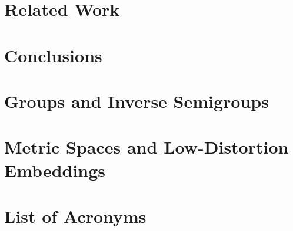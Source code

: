 \documentclass[
		twoside,openright,titlepage,numbers=noenddot,headinclude,%
	 	footinclude=true,cleardoublepage=empty,
		dottedtoc, %
		BCOR=5mm,paper=a4,fontsize=10pt, %
		ngerman,american, %
		]{scrreprt}
\begin{document}
\chapter{Related Work}


\chapter{Conclusions} 


\appendix

\chapter{Groups and Inverse Semigroups}
\label{appendix:groups}

\chapter{Metric Spaces and Low-Distortion Embeddings}
\label{appendix:metric}

%

%
%
\clearpage
\printbibliography[title={References},notkeyword={contribution}]

\listoffigures

\printindex

\chapter*{List of Acronyms}

\clearpage
\end{document}
